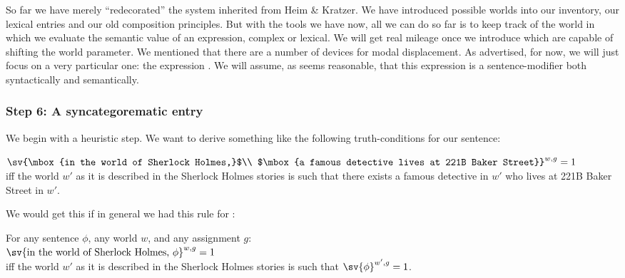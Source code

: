 %
%
So far we have merely ``redecorated'' the system inherited from Heim \&
Kratzer. We have introduced possible worlds into our inventory, our lexical
entries and our old composition principles. But with the tools we have now, all
we can do so far is to keep track of the world in which we evaluate the semantic
value of an expression, complex or lexical. We will get real mileage once we
introduce  which are capable of shifting the world
parameter. We mentioned that there are a number of devices for modal
displacement. As advertised, for now, we will just focus on a very particular
one: the expression . We will
assume, as seems reasonable, that this expression is a sentence-modifier both
syntactically and semantically.

\subsubsection{Step 6: A syncategorematic entry} \label{sec:sync-entry}

We begin with a heuristic step. We want to derive something like the following
truth-conditions for our sentence:

\ex $\sv{\mbox{in the world of Sherlock Holmes,}$\\
  $\mbox{a famous detective lives at 221B Baker Street}}^{w,g} = 1$\\
iff the world $w'$ as it is described in the Sherlock Holmes stories is such
that there exists a famous detective in $w'$ who lives at 221B Baker Street in
$w'$.
\xe

We would get this if in general we had this rule for :

\ex For any sentence $\phi$, any world $w$, and any assignment $g$:\\
$\sv{\mbox{in the world of Sherlock Holmes, }\phi}^{w,g} = 1$\\
iff the world $w'$ as it is described in the Sherlock Holmes stories is such
that $\sv{\phi}^{w',g} = 1$.
\xe


